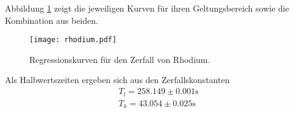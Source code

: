 Abbildung \ref{fig:regress} zeigt die jeweiligen Kurven für ihren Geltungsbereich sowie die Kombination aus beiden.

\begin{figure}
 \centering
 \texttt{[image: rhodium.pdf]}
 \caption{Regressionskurven für den Zerfall von Rhodium.}
 \label{fig:regress}
\end{figure}

\noindent Als Halbwertszeiten ergeben sich aus den Zerfallskonstanten
\begin{align*}
    T_l = 258.149 \pm 0.001 \si{\s} \\
    T_k = 43.054 \pm 0.025 \si{\s}\\
\end{align*}